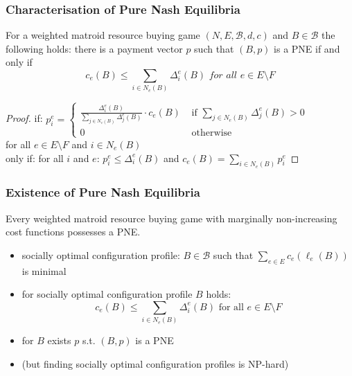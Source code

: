 \documentclass{beamer}
\newcommand{\tupel}[1]{\left(#1\right)}
\begin{document}
\begin{frame}
  \frametitle{Characterisation of Pure Nash Equilibria}
  \begin{theorem}
    For a weighted matroid resource buying game
    $\tupel{N, E, \mathcal{B}, d, c}$ and $B\in\mathcal{B}$ the following
    holds: there is a payment vector $p$ such that $\tupel{B,p}$ is a
    PNE if and only if
    \begin{equation*}
      c_{e}(B) \leq \sum_{i\in N_{e}(B)}\Delta_{i}^{e}(B)
      \textit{ for all }e\in E\setminus F
    \end{equation*}
  \end{theorem}
  \begin{proof}
    if: $p_{i}^{e} =
      \begin{cases}
        \frac{\Delta_{i}^{e}(B)}{\sum_{j\in N_{e}(B)}\Delta_{j}^{e}(B)}\cdot
        c_{e}(B)&\text{ if } \sum_{j\in N_{e}(B)}\Delta_{j}^{e}(B) > 0\\
        0 &\text{ otherwise}
      \end{cases}$\\
      for all $e\in E\setminus F$ and $i\in N_{e}(B)$\\
    only if: for all $i$ and $e$: $p_{i}^{e} \leq \Delta_{i}^{e}(B)$
      and $c_{e}(B) = \sum_{i\in N_{e}(B)}p_{i}^{e}$
  \end{proof}
\end{frame}

\begin{frame}
  \frametitle{Existence of Pure Nash Equilibria}
  \begin{theorem}
    Every weighted matroid resource buying game with marginally non-increasing
    cost functions possesses a PNE.
  \end{theorem}
  \begin{itemize}
    \item socially optimal configuration profile: $B\in\mathcal{B}$ such that
      $\sum_{e\in E}c_{e}(\ell_{e}(B))$ is minimal
    \item for socially optimal configuration profile $B$ holds:
      \begin{equation*}
        c_{e}(B)\leq \sum_{i\in N_{e}(B)}\Delta_{i}^{e}(B)
        \text{ for all }e\in E\setminus F
      \end{equation*}
    \item for $B$ exists $p$ s.t. $\tupel{B,p}$ is a PNE
    \item (but finding socially optimal configuration profiles is NP-hard)
  \end{itemize}
\end{frame}
\end{document}
